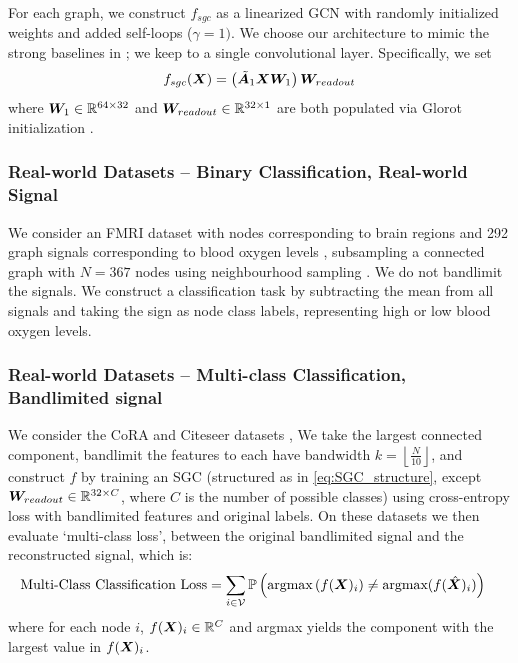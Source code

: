 For each graph, we construct $f_{sgc}$ as a linearized GCN with randomly initialized weights and added self-loops ($\gamma=1)$. We choose our architecture to mimic the strong baselines in \cite{luo2024classic}; we keep to a single convolutional layer. %
Specifically, we set
\begin{equation}
 f_{sgc}(\bm{X}) =  
\left(\tilde{\bm{A}}_{1}\bm{X}\bm{W}_{1} \right)\bm{W}_{readout} 
\label{eq:SGC_structure}
\end{equation}
 where $\bm{W}_{1} \in \mathbb{R}^{64 \times 32}$ and  $\bm{W}_{readout} \in \mathbb{R}^{32 \times 1}$ are both populated via Glorot initialization \cite{glorot2010understanding}.

\subsubsection{Real-world Datasets -- {\color{blue} Binary Classification, Real-world Signal}}
We consider an FMRI dataset with nodes corresponding to brain regions and 292 graph signals corresponding to blood oxygen levels \cite{zhi2023gaussian, sripathmanathan2024impact}, subsampling a connected graph with $N=367$ nodes using neighbourhood sampling \cite{hamilton2017inductive}. We do not bandlimit the  signals. We construct a classification task by subtracting the mean from all signals and taking the sign as node class labels, representing high or low blood oxygen levels.

\subsubsection{{\color{blue} Real-world Datasets -- Multi-class Classification, Bandlimited signal}}
We consider the CoRA and Citeseer  datasets  \cite{ribeiro2017struc2vec},  We take the largest connected component, bandlimit the features to each have bandwidth $k=\left\lfloor \frac{N}{10} \right\rfloor$, and construct $f$ by training an SGC (structured as in \eqref{eq:SGC_structure}, except $\bm{W}_{readout} \in \mathbb{R}^{32 \times C}$, where $C$ is the number of possible classes) using cross-entropy loss with bandlimited features and original labels. 
On these datasets we then evaluate `multi-class loss', between the original bandlimited signal and the reconstructed signal, which is:
\begin{align}
    &\text{Multi-Class Classification Loss} = {\sum_{i \in \set{V}}\prob{\text{argmax}\left(f(\matr{X})_{i}\right) \neq \text{argmax}(f(\hat{\matr{X}})_{i})}}
\end{align}
where for each node $i$, $f(\bm{X})_{i} \in \mathbb{R}^{C}$ and argmax yields the component with the largest value in $f(\bm{X})_{i}$.

